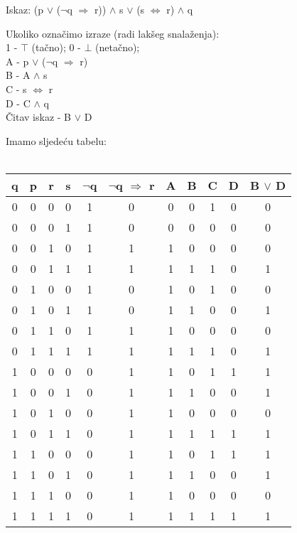 \documentclass[12pt]{article}
\begin{document}
\begin{enumerate}
		Iskaz:  (p {$\vee$} ({$\neg$}q {$\Rightarrow$} r)) {$\wedge$} s {$\vee$} (s {$\Leftrightarrow$} r) {$\wedge$} q 
		
		Ukoliko označimo izraze (radi lakšeg snalaženja): \\ 
		1 - {$\top$} (tačno); 0 - {$\bot$} (netačno); \\
		A - p {$\vee$} ({$\neg$}q {$\Rightarrow$} r) \\
		B - A {$\wedge$} s \\
		C - s {$\Leftrightarrow$} r \\
		D - C {$\wedge$} q \\
		Čitav iskaz - B {$\vee$} D
		
		Imamo sljedeću tabelu: \\
		\\
		\begin{tabular}{|c|c|c|c|c|c|c|c|c|c|c|}
    	\hline q & p & r & s & {$\neg$}q & {$\neg$}q {$\Rightarrow$} r & A & B & C & D & B {$\vee$} D \\
    	\hline 0 & 0 & 0 & 0 & 1 & 0 & 0 & 0 & 1 & 0 & 0\\
    	\hline 0 & 0 & 0 & 1 & 1 & 0 & 0 & 0 & 0 & 0 & 0\\
    	\hline 0 & 0 & 1 & 0 & 1 & 1 & 1 & 0 & 0 & 0 & 0\\
    	\hline 0 & 0 & 1 & 1 & 1 & 1 & 1 & 1 & 1 & 0 & 1\\
    	\hline 0 & 1 & 0 & 0 & 1 & 0 & 1 & 0 & 1 & 0 & 0\\
    	\hline 0 & 1 & 0 & 1 & 1 & 0 & 1 & 1 & 0 & 0 & 1\\
    	\hline 0 & 1 & 1 & 0 & 1 & 1 & 1 & 0 & 0 & 0 & 0\\
    	\hline 0 & 1 & 1 & 1 & 1 & 1 & 1 & 1 & 1 & 0 & 1\\
    	\hline 1 & 0 & 0 & 0 & 0 & 1 & 1 & 0 & 1 & 1 & 1\\
    	\hline 1 & 0 & 0 & 1 & 0 & 1 & 1 & 1 & 0 & 0 & 1\\
    	\hline 1 & 0 & 1 & 0 & 0 & 1 & 1 & 0 & 0 & 0 & 0\\
    	\hline 1 & 0 & 1 & 1 & 0 & 1 & 1 & 1 & 1 & 1 & 1\\
    	\hline 1 & 1 & 0 & 0 & 0 & 1 & 1 & 0 & 1 & 1 & 1\\
    	\hline 1 & 1 & 0 & 1 & 0 & 1 & 1 & 1 & 0 & 0 & 1\\
    	\hline 1 & 1 & 1 & 0 & 0 & 1 & 1 & 0 & 0 & 0 & 0\\
    	\hline 1 & 1 & 1 & 1 & 0 & 1 & 1 & 1 & 1 & 1 & 1\\
    	\hline
     \end{tabular}
		

\end{enumerate}
\end{document}
